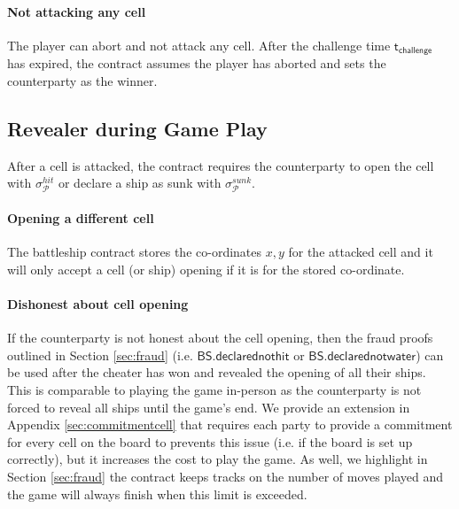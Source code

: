 \documentclass{llncs}
\newcommand{\participant}{\mathcal{P}}
\newcommand{\battleshipdeclarednothit}{\mathsf{BS.declarednothit}}
\newcommand{\battleshipdeclarednotwater}{\mathsf{BS.declarednotwater}}
\newcommand{\timechallenge}{\mathsf{t}_{\mathsf{challenge}}}
\begin{document}
	\paragraph{Not attacking any cell} 
	The player can abort and not attack any cell. 
	After the challenge time $\timechallenge$ has expired, the contract assumes the player has aborted and sets the counterparty as the winner. 
	
	\subsection{Revealer during Game Play} 
	After a cell is attacked, the contract requires the counterparty to open the cell with $\sigma^{hit}_{\participant}$ or declare a ship as sunk with  $\sigma^{sunk}_{\participant}$.
	
	\paragraph{Opening a different cell}
	The battleship contract stores the co-ordinates $x,y$ for the attacked cell and it will only accept a cell (or ship) opening if it is for the stored co-ordinate. 
	
	\paragraph{Dishonest about cell opening}
	If the counterparty is not honest about the cell opening, then the fraud proofs outlined in Section \ref{sec:fraud} (i.e. $\battleshipdeclarednothit$ or $\battleshipdeclarednotwater$) can be used after the cheater has won and revealed the opening of all their ships. 
	This is comparable to playing the game in-person as the counterparty is not forced to reveal all ships until the game's end. 
	We provide an extension in Appendix \ref{sec:commitmentcell} that requires each party to provide a commitment for every cell on the board to prevents this issue (i.e. if the board is set up correctly), but it increases the cost to play the game. 
	As well, we highlight in Section \ref{sec:fraud} the contract keeps tracks on the number of moves played and the game will always finish when this limit is exceeded. 
	
\end{document}
